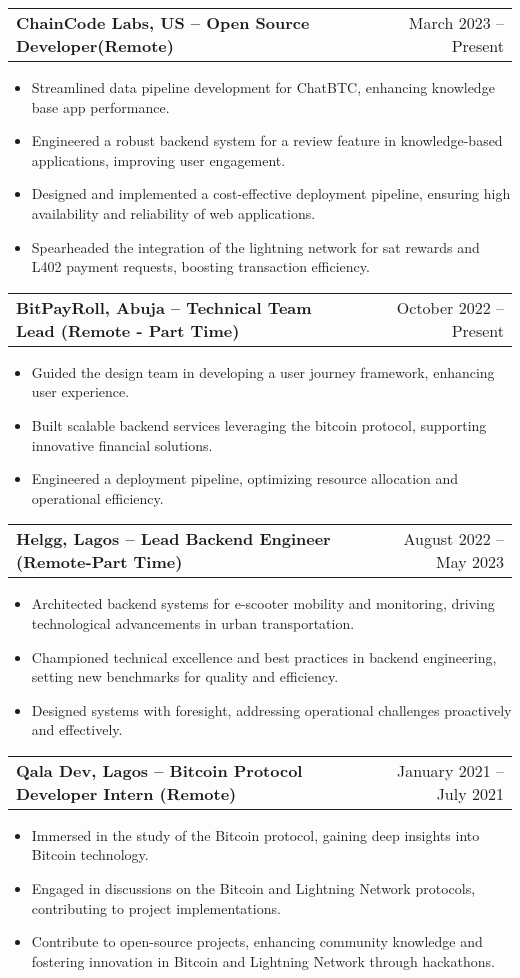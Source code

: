 \documentclass[a4paper,12pt]{article}
\makeatletter
\newenvironment{joblong}[2]
    {
    \begin{tabularx}{\linewidth}{@{}l X r@{}}
    \textbf{#1} & \hfill &  #2 \\[3.75pt]
    \end{tabularx}
    \begin{minipage}[t]{\linewidth}
    \begin{itemize}[nosep,after=\strut, leftmargin=1em, itemsep=3pt,label=--]
    }
    {
    \end{itemize}
    \end{minipage}    
    }
\makeatother
\begin{document}
\begin{joblong}{ChainCode Labs, US -- Open Source Developer(Remote)}{March 2023 -- Present}
\item Streamlined data pipeline development for ChatBTC, enhancing knowledge base app performance.
\item Engineered a robust backend system for a review feature in knowledge-based applications, improving user engagement.
\item Designed and implemented a cost-effective deployment pipeline, ensuring high availability and reliability of web applications.
\item Spearheaded the integration of the lightning network for sat rewards and L402 payment requests, boosting transaction efficiency.
\end{joblong}

\begin{joblong}{BitPayRoll, Abuja -- Technical Team Lead (Remote - Part Time)}{October 2022 -- Present}
\item Guided the design team in developing a user journey framework, enhancing user experience.
\item Built scalable backend services leveraging the bitcoin protocol, supporting innovative financial solutions.
\item Engineered a deployment pipeline, optimizing resource allocation and operational efficiency.
\end{joblong}

\begin{joblong}{Helgg, Lagos -- Lead Backend Engineer (Remote-Part Time)}{August 2022 -- May 2023}
\item Architected backend systems for e-scooter mobility and monitoring, driving technological advancements in urban transportation.
\item Championed technical excellence and best practices in backend engineering, setting new benchmarks for quality and efficiency.
\item Designed systems with foresight, addressing operational challenges proactively and effectively.
\end{joblong}

\begin{joblong}{Qala Dev, Lagos -- Bitcoin Protocol Developer Intern (Remote)}{January 2021 -- July 2021}
\item Immersed in the study of the Bitcoin protocol, gaining deep insights into Bitcoin technology.
\item Engaged in discussions on the Bitcoin and Lightning Network protocols, contributing to project implementations.
\item Contribute to open-source projects, enhancing community knowledge and fostering innovation in Bitcoin and Lightning Network through hackathons.
\end{joblong}
\end{document}
